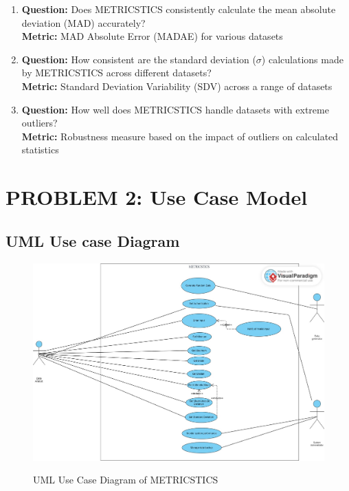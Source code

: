 \documentclass[letterpaper,12pt]{article}
\begin{document}
\begin{enumerate}
\item \textbf{Question:} Does METRICSTICS consistently calculate the mean absolute deviation (MAD) accurately?\\
\textbf{Metric:} MAD Absolute Error (MADAE) for various datasets
\item \textbf{Question:} How consistent are the standard deviation ($\sigma$) calculations made by METRICSTICS across different datasets?\\
\textbf{Metric:} Standard Deviation Variability (SDV) across a range of datasets
\item \textbf{Question:} How well does METRICSTICS handle datasets with extreme outliers?\\
\textbf{Metric:} Robustness measure based on the impact of outliers on calculated statistics
\end{enumerate}
\newpage
\section{PROBLEM 2: Use Case Model}
\subsection{UML Use case Diagram}
\begin{figure}[htb]
\begin{center}
\includegraphics[width=14cm]{usecase.jpg}
\caption \protect UML Use Case Diagram of METRICSTICS
\end{center}
\end{figure}
\end{document}
